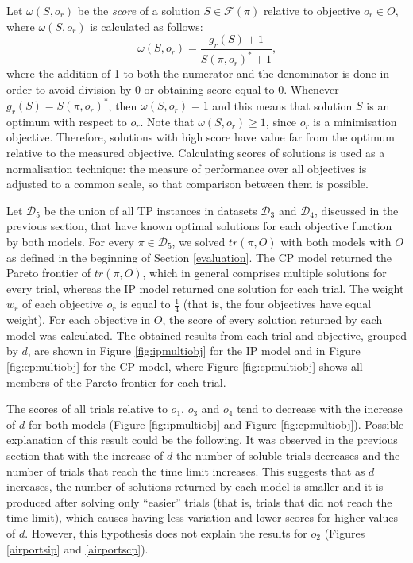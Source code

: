 \documentclass{mpaper}
\begin{document}
Let $\omega(S,o_{r})$ be the \textit{score} of a solution $S \in \mathcal{F}(\pi)$ relative to objective $o_r \in O$, where $\omega(S,o_{r})$ is calculated as follows:
\vspace{-1mm}
\begin{equation}
\label{eq:score}
\omega(S,o_{r}) = \frac{g_{r}(S) + 1}{S(\pi,o_r)^\ast + 1} \textrm{,}
\end{equation}
where the addition of 1 to both the numerator and the denominator is done in order to avoid division by 0 or obtaining score equal to 0.
Whenever $g_{r}(S) = S(\pi, o_r)^\ast$, then $\omega(S,o_{r}) = 1$ and this means that solution $S$ is an optimum with respect to $o_r$. Note that $\omega(S,o_{r}) \geq 1$, since $o_r$ is a minimisation objective. Therefore, solutions with high score have value far from the optimum relative to the measured objective. Calculating scores of solutions is used as a normalisation technique: the measure of performance over all objectives is adjusted to a common scale, so that comparison between them is possible.

Let $\mathcal{D}_5$ be the union of all TP instances in datasets $\mathcal{D}_3$ and $\mathcal{D}_4$, discussed in the previous section, that have known optimal solutions for each objective function by both models. For every $\pi \in \mathcal{D}_5$, we solved $tr(\pi,O)$ with both models with $O$ as defined in the beginning of Section \ref{evaluation}. The CP model returned the Pareto frontier of $tr(\pi,O)$, which in general comprises multiple solutions for every trial, whereas the IP model returned one solution for each trial. The weight $w_r$ of each objective $o_r$ is equal to $\frac{1}{4}$ (that is, the four objectives have equal weight). For each objective in $O$, the score of every solution returned by each model was calculated. The obtained results from each trial and objective, grouped by $d$, are shown in Figure \ref{fig:ipmultiobj} for the IP model and in Figure \ref{fig:cpmultiobj} for the CP model, where Figure \ref{fig:cpmultiobj} shows all members of the Pareto frontier for each trial.

The scores of all trials relative to $o_1$, $o_3$ and $o_4$ tend to decrease with the increase of $d$ for both models (Figure \ref{fig:ipmultiobj} and Figure \ref{fig:cpmultiobj}). Possible explanation of this result could be the following. It was observed in the previous section that with the increase of $d$ the number of soluble trials decreases and the number of trials that reach the time limit increases. This suggests that as $d$ increases, the number of solutions returned by each model is smaller and it is produced after solving only ``easier'' trials (that is, trials that did not reach the time limit), which causes having less variation and lower scores for higher values of $d$. However, this hypothesis does not explain the results for $o_2$ (Figures \ref{airportsip} and \ref{airportscp}).
\end{document}
